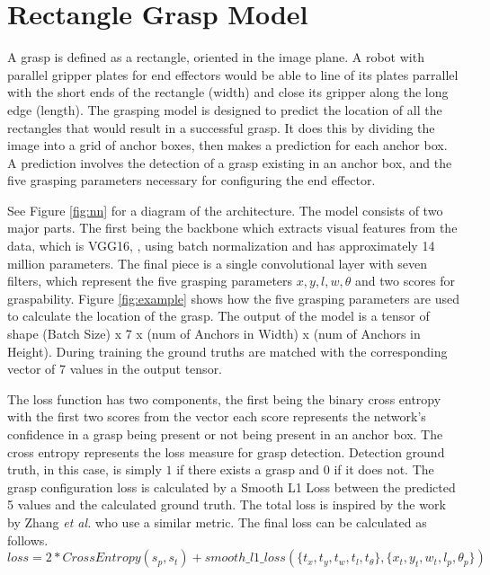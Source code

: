 \documentclass{article}
\begin{document}
\newpage
\section{Rectangle Grasp Model}
A grasp is defined as a rectangle, oriented in the image plane. A robot with
parallel gripper plates for end effectors would be able to line of its plates
parrallel with the short ends of the rectangle (width) and close its gripper along the
long edge (length). The grasping model is designed to predict the location of all
the rectangles that would result in a successful grasp. It does this by dividing the
image into a grid of anchor boxes, then makes a prediction for each anchor box. A
prediction involves the detection of a grasp existing in an anchor box, and the five
grasping parameters necessary for configuring the end effector.

See Figure \ref{fig:nn} for a diagram of the architecture.
The model consists of two major parts. The first being the backbone which extracts
visual features from the data, which is VGG16, \cite{simonyan14},
using batch normalization and has approximately 14 million parameters. The final
piece is a single convolutional layer with seven filters, which represent the
five grasping parameters $x, y, l, w, \theta$ and two scores for graspability.
Figure \ref{fig:example} shows how the five grasping parameters are used to
calculate the location of the grasp. The output of the model is a tensor of
shape (Batch Size) x 7 x (num of Anchors in Width) x (num of Anchors in Height).
During training the ground truths are matched with the corresponding vector of
7 values in the output tensor.

The loss function has two components, the first being the binary cross entropy
with the first two scores from the vector each score represents the network's
confidence in a grasp being present or not being present in an anchor box.
The cross entropy
represents the loss measure for grasp detection. Detection ground truth, in
this case, is simply $1$ if there exists a grasp and $0$ if it does not.
The grasp configuration loss is calculated by a Smooth L1 Loss between
the predicted 5 values and the calculated ground truth. The total loss is inspired
by the work by Zhang \textit{et al.} \cite{zhang18} who use a similar metric.
The final loss can be calculated as follows.
\begin{equation*}
loss = 2*CrossEntropy(s_p, s_t) + smooth\_l1\_loss(\{t_x, t_y, t_w, t_l, t_\theta\}, \{x_t, y_t, w_t, l_p, \theta_p\})
\end{equation*}
\end{document}
